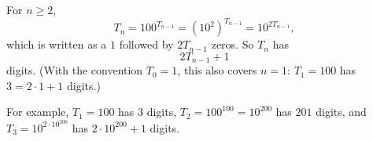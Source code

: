 For $n\ge2$,
\[T_n=100^{T_{n-1}}=\left(10^2\right)^{T_{n-1}}=10^{2T_{n-1}},\]
which is written as a $1$ followed by $2T_{n-1}$ zeros. So $T_n$ has
\[\boxed{2T_{n-1}+1}\]
digits. (With the convention $T_0=1$, this also covers $n=1$: $T_1=100$ has $3=2\cdot1+1$ digits.)

For example, $T_1=100$ has $3$ digits, $T_2=100^{100}=10^{200}$ has $201$ digits, and $T_3=10^{2\cdot10^{200}}$ has $2\cdot10^{200}+1$ digits.
